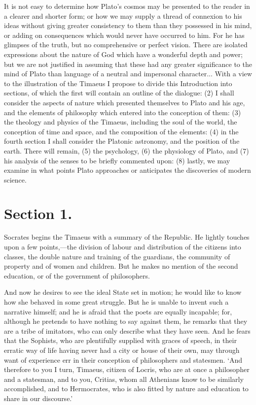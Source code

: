 \documentclass[11pt,letter]{article}
\begin{document}
\par  It is not easy to determine how Plato’s cosmos may be presented to the reader in a clearer and shorter form; or how we may supply a thread of connexion to his ideas without giving greater consistency to them than they possessed in his mind, or adding on consequences which would never have occurred to him. For he has glimpses of the truth, but no comprehensive or perfect vision. There are isolated expressions about the nature of God which have a wonderful depth and power; but we are not justified in assuming that these had any greater significance to the mind of Plato than language of a neutral and impersonal character... With a view to the illustration of the Timaeus I propose to divide this Introduction into sections, of which the first will contain an outline of the dialogue: (2) I shall consider the aspects of nature which presented themselves to Plato and his age, and the elements of philosophy which entered into the conception of them: (3) the theology and physics of the Timaeus, including the soul of the world, the conception of time and space, and the composition of the elements: (4) in the fourth section I shall consider the Platonic astronomy, and the position of the earth. There will remain, (5) the psychology, (6) the physiology of Plato, and (7) his analysis of the senses to be briefly commented upon: (8) lastly, we may examine in what points Plato approaches or anticipates the discoveries of modern science.

\par 
\section{
      Section 1.
    }
\par  Socrates begins the Timaeus with a summary of the Republic. He lightly touches upon a few points,—the division of labour and distribution of the citizens into classes, the double nature and training of the guardians, the community of property and of women and children. But he makes no mention of the second education, or of the government of philosophers.

\par  And now he desires to see the ideal State set in motion; he would like to know how she behaved in some great struggle. But he is unable to invent such a narrative himself; and he is afraid that the poets are equally incapable; for, although he pretends to have nothing to say against them, he remarks that they are a tribe of imitators, who can only describe what they have seen. And he fears that the Sophists, who are plentifully supplied with graces of speech, in their erratic way of life having never had a city or house of their own, may through want of experience err in their conception of philosophers and statesmen. ‘And therefore to you I turn, Timaeus, citizen of Locris, who are at once a philosopher and a statesman, and to you, Critias, whom all Athenians know to be similarly accomplished, and to Hermocrates, who is also fitted by nature and education to share in our discourse.’
\end{document}
